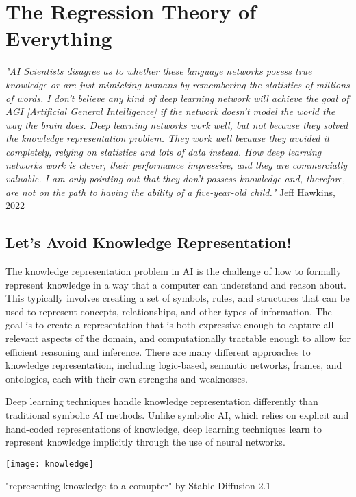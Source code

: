 \setchapterpreamble[u]{\margintoc}
\chapter{The Regression Theory of Everything}

\textit{"AI Scientists disagree as to whether these language networks posess true knowledge or are just mimicking humans by remembering the statistics of millions of words. I don't believe any kind of deep learning network will achieve the goal of AGI [Artificial General Intelligence] if the network doesn't model the world the way the brain does. Deep learning networks work well, but not because they solved the knowledge representation problem. They work well because they avoided it completely, relying on statistics and lots of data instead. How deep learning networks work is clever, their performance impressive, and they are commercially valuable. I am only pointing out that they don't possess knowledge and, therefore, are not on the path to having the ability of a five-year-old child."} Jeff Hawkins, 2022 \cite{hawkins_2022}

\section{Let's Avoid Knowledge Representation!}

The knowledge representation problem in AI is the challenge of how to formally represent knowledge in a way that a computer can understand and reason about. This typically involves creating a set of symbols, rules, and structures that can be used to represent concepts, relationships, and other types of information. The goal is to create a representation that is both expressive enough to capture all relevant aspects of the domain, and computationally tractable enough to allow for efficient reasoning and inference. There are many different approaches to knowledge representation, including logic-based, semantic networks, frames, and ontologies, each with their own strengths and weaknesses.

Deep learning techniques handle knowledge representation differently than traditional symbolic AI methods. Unlike symbolic AI, which relies on explicit and hand-coded representations of knowledge, deep learning techniques learn to represent knowledge implicitly through the use of neural networks.


\begin{marginfigure}[-5.5cm]
        \texttt{[image: knowledge]}
        \caption{"representing knowledge to a comupter" by Stable Diffusion 2.1}
\end{marginfigure}



